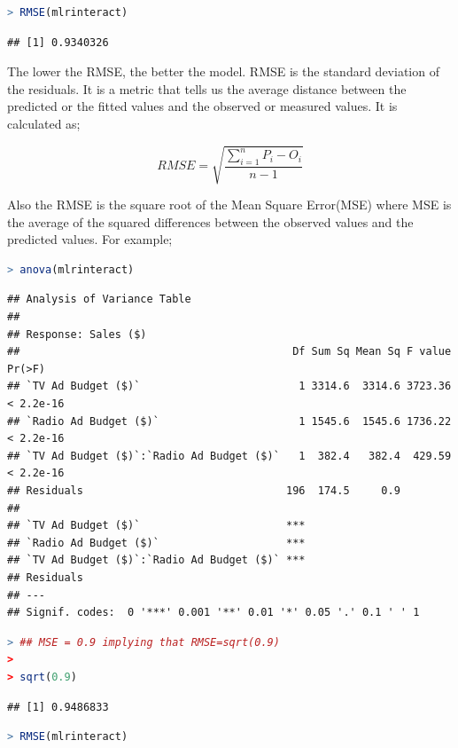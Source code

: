 \documentclass[
]{article}
\begin{document}
\begin{lstlisting}[language=R]
> RMSE(mlrinteract)
\end{lstlisting}

\begin{lstlisting}
## [1] 0.9340326
\end{lstlisting}

The lower the RMSE, the better the model. RMSE is the standard deviation
of the residuals. It is a metric that tells us the average distance
between the predicted or the fitted values and the observed or measured
values. It is calculated as;

\[RMSE=\sqrt{\frac{\sum_{i=1}^n P_i-O_i}{n-1}} \]

Also the RMSE is the square root of the Mean Square Error(MSE) where MSE
is the average of the squared differences between the observed values
and the predicted values. For example;

\begin{lstlisting}[language=R]
> anova(mlrinteract)
\end{lstlisting}

\begin{lstlisting}
## Analysis of Variance Table
## 
## Response: Sales ($)
##                                           Df Sum Sq Mean Sq F value    Pr(>F)
## `TV Ad Budget ($)`                         1 3314.6  3314.6 3723.36 < 2.2e-16
## `Radio Ad Budget ($)`                      1 1545.6  1545.6 1736.22 < 2.2e-16
## `TV Ad Budget ($)`:`Radio Ad Budget ($)`   1  382.4   382.4  429.59 < 2.2e-16
## Residuals                                196  174.5     0.9                  
##                                             
## `TV Ad Budget ($)`                       ***
## `Radio Ad Budget ($)`                    ***
## `TV Ad Budget ($)`:`Radio Ad Budget ($)` ***
## Residuals                                   
## ---
## Signif. codes:  0 '***' 0.001 '**' 0.01 '*' 0.05 '.' 0.1 ' ' 1
\end{lstlisting}

\begin{lstlisting}[language=R]
> ## MSE = 0.9 implying that RMSE=sqrt(0.9)
> 
> sqrt(0.9)
\end{lstlisting}

\begin{lstlisting}
## [1] 0.9486833
\end{lstlisting}

\begin{lstlisting}[language=R]
> RMSE(mlrinteract)
\end{lstlisting}
\end{document}
